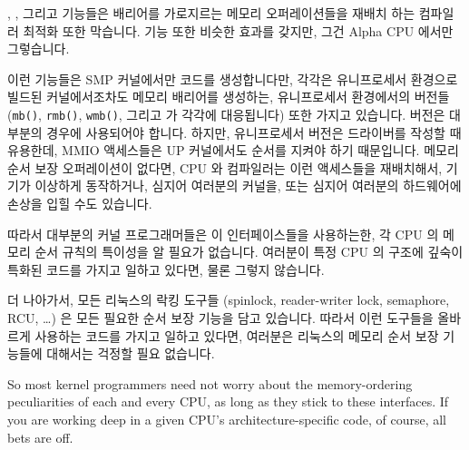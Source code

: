 , , 그리고  기능들은 배리어를
가로지르는 메모리 오퍼레이션들을 재배치 하는 컴파일러 최적화 또한 막습니다.
 기능 또한 비슷한 효과를 갖지만, 그건 Alpha CPU
에서만 그렇습니다.

이런 기능들은 SMP 커널에서만 코드를 생성합니다만, 각각은 유니프로세서 환경으로
빌드된 커널에서조차도 메모리 배리어를 생성하는, 유니프로세서 환경에서의 버전들
({\tt mb()}, {\tt rmb()}, {\tt wmb()}, 그리고  가
각각에 대응됩니다) 또한 가지고 있습니다.
 버전은 대부분의 경우에 사용되어야 합니다.
하지만, 유니프로세서 버전은 드라이버를 작성할 때 유용한데, MMIO 액세스들은 UP
커널에서도 순서를 지켜야 하기 때문입니다.
메모리 순서 보장 오퍼레이션이 없다면, CPU 와 컴파일러는 이런 액세스들을
재배치해서, 기기가 이상하게 동작하거나, 심지어 여러분의 커널을, 또는 심지어
여러분의 하드웨어에 손상을 입힐 수도 있습니다.

따라서 대부분의 커널 프로그래머들은 이 인터페이스들을 사용하는한, 각 CPU 의
메모리 순서 규칙의 특이성을 알 필요가 없습니다.
여러분이 특정 CPU 의 구조에 깊숙이 특화된 코드를 가지고 일하고 있다면, 물론
그렇지 않습니다.

더 나아가서, 모든 리눅스의 락킹 도구들 (spinlock, reader-writer lock,
semaphore, RCU, \ldots) 은 모든 필요한 순서 보장 기능을 담고 있습니다.
따라서 이런 도구들을 올바르게 사용하는 코드를 가지고 일하고 있다면, 여러분은
리눅스의 메모리 순서 보장 기능들에 대해서는 걱정할 필요 없습니다.
\iffalse

So most kernel programmers need not worry about the memory-ordering
peculiarities of each and every CPU, as long as they stick to these
interfaces.
If you are working deep in a given CPU's architecture-specific code,
of course, all bets are off.

